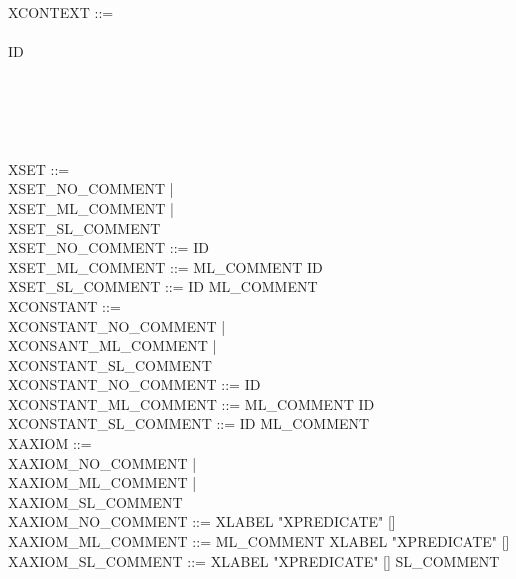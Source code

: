 \begin{center}
  \begin{Bcode}
    XCONTEXT ::= \\
    \Btab {}\\
    \Btab \Btab \Bcontext{} ID \\
    \Btab \Btab [\Bextends{} ID \{ ID \}]\\
    \Btab {}\\
    \Btab {}\\
    \Btab {}\\[2ex]
    \Btab \Btab \Bend\\
    XSET ::= \\
    \Btab \Btab XSET\_NO\_COMMENT | \\
    \Btab \Btab XSET\_ML\_COMMENT | \\
    \Btab \Btab XSET\_SL\_COMMENT \\
    XSET\_NO\_COMMENT ::= ID \\
    XSET\_ML\_COMMENT ::= ML\_COMMENT ID\\
    XSET\_SL\_COMMENT ::= ID ML\_COMMENT\\
    XCONSTANT ::= \\
    \Btab \Btab XCONSTANT\_NO\_COMMENT | \\
    \Btab \Btab XCONSANT\_ML\_COMMENT | \\
    \Btab \Btab XCONSTANT\_SL\_COMMENT \\
    XCONSTANT\_NO\_COMMENT ::= ID \\
    XCONSTANT\_ML\_COMMENT ::= ML\_COMMENT ID\\
    XCONSTANT\_SL\_COMMENT ::= ID ML\_COMMENT\\
    XAXIOM ::= \\
    \Btab \Btab XAXIOM\_NO\_COMMENT | \\
    \Btab \Btab XAXIOM\_ML\_COMMENT | \\
    \Btab \Btab XAXIOM\_SL\_COMMENT \\
    XAXIOM\_NO\_COMMENT ::= XLABEL "XPREDICATE" [\Btheorem]\\
    XAXIOM\_ML\_COMMENT ::= ML\_COMMENT XLABEL "XPREDICATE" [\Btheorem]\\
    XAXIOM\_SL\_COMMENT ::= XLABEL "XPREDICATE" [\Btheorem] SL\_COMMENT\\
  \end{Bcode}
\end{center}

